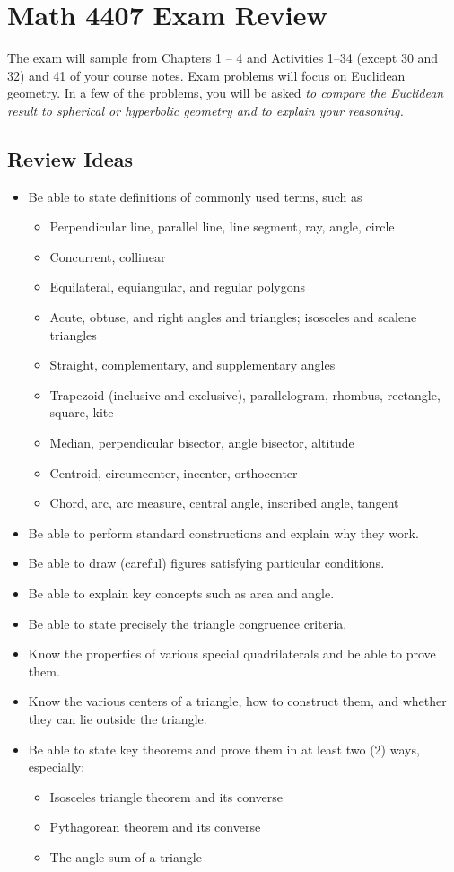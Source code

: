 \newpage

\section{Math 4407 Exam Review}
The exam will sample from Chapters 1 -- 4 and Activities 1--34 (except 30 and 32) and 41 of your course notes.  Exam problems will focus on Euclidean geometry.  In a few of the problems, you will be asked \emph{to compare the Euclidean result to spherical or hyperbolic geometry and to explain your reasoning.}  
\subsection{Review Ideas}

\begin{itemize}\itemsep0em
\item Be able to state definitions of commonly used terms, such as 
\begin{itemize}
\item Perpendicular line, parallel line, line segment, ray, angle, circle
\item Concurrent, collinear
\item Equilateral, equiangular, and regular polygons
\item Acute, obtuse, and right angles and triangles; isosceles and scalene triangles
\item Straight, complementary, and supplementary angles
\item Trapezoid (inclusive and exclusive), parallelogram, rhombus, rectangle, square, kite
\item Median, perpendicular bisector, angle bisector, altitude
\item Centroid, circumcenter, incenter, orthocenter
\item Chord, arc, arc measure, central angle, inscribed angle, tangent
\end{itemize}
\item Be able to perform standard constructions and explain why they work. 
\item Be able to draw (careful) figures satisfying particular conditions.  
\item Be able to explain key concepts such as area and angle.   
\item Be able to state precisely the triangle congruence criteria. 
\item Know the properties of various special quadrilaterals and be able to prove them.  
\item Know the various centers of a triangle, how to construct them, and whether they can lie outside the triangle.  
\item Be able to state key theorems and prove them in at least two (2) ways, especially:  
\begin{itemize}
\item Isosceles triangle theorem and its converse
\item Pythagorean theorem and its converse
\item The angle sum of a triangle 
\end{itemize}


\end{itemize}
